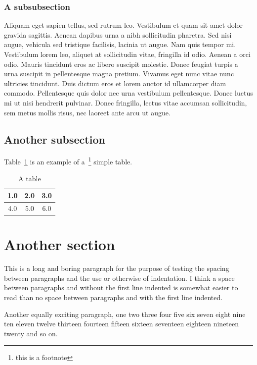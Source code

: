 \subsubsection{A subsubsection}

Aliquam eget sapien tellus, sed rutrum leo. Vestibulum et quam sit amet dolor 
gravida sagittis. Aenean dapibus urna a nibh sollicitudin pharetra. Sed nisi 
augue, vehicula sed tristique facilisis, lacinia ut augue. Nam quis tempor mi. 
Vestibulum lorem leo, aliquet at sollicitudin vitae, fringilla id odio. Aenean 
a orci odio. Mauris tincidunt eros ac libero suscipit molestie. Donec feugiat 
turpis a urna suscipit in pellentesque magna pretium. Vivamus eget nunc vitae 
nunc ultricies tincidunt. Duis dictum eros et lorem auctor id ullamcorper diam 
commodo. Pellentesque quis dolor nec urna vestibulum pellentesque. Donec 
luctus mi ut nisi hendrerit pulvinar. Donec fringilla, lectus vitae accumsan 
sollicitudin, sem metus mollis risus, nec laoreet ante arcu ut augue.

\subsection{Another subsection}

Table~\ref{tab:atable} is an example of a~\footnote{this is a
footnote} simple table.

\begin{table}[htb]
\begin{center}
\begin{tabular}{|c|c|c|}
\hline
1.0 & 2.0 & 3.0 \\
\hline
4.0 & 5.0 & 6.0 \\
\hline
\end{tabular}
\caption{A table}
\label{tab:atable}
\end{center}
\end{table}


\section{Another section}

This is a long and boring paragraph for the purpose of testing the
spacing between paragraphs and the use or otherwise of indentation. I
think a space between paragraphs and without the first line indented
is somewhat easier to read than no space between paragraphs and with
the first line indented.

Another equally exciting paragraph, one two three four five six seven
eight nine ten eleven twelve thirteen fourteen fifteen sixteen
seventeen eighteen nineteen twenty and so on.

